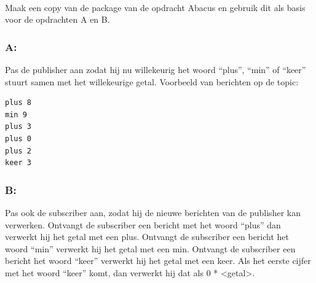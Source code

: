 \begin{exercise}\mbox{}\\
Maak een copy van de package van de opdracht Abacus en gebruik dit als basis voor de opdrachten A en B. 
\subsubsection{A:} 
Pas de publisher aan zodat hij nu willekeurig het woord “plus”, “min” of “keer” stuurt samen met het willekeurige getal. Voorbeeld van berichten op de topic:


\begin{minipage}{0.9\linewidth}
\begin{lstlisting}[style=DOS, firstnumber=0]
plus 8 
min 9 
plus 3 
plus 0 
plus 2 
keer 3
\end{lstlisting}
\end{minipage}

\subsubsection{B:}
Pas ook de subscriber aan, zodat hij de nieuwe berichten van de publisher kan verwerken. Ontvangt de subscriber een bericht met het woord “plus” dan verwerkt hij het getal met een plus. Ontvangt de subscriber een bericht het woord “min” verwerkt hij het getal met een min. Ontvangt de subscriber een bericht het woord “keer” verwerkt hij het getal met een keer. Als het eerste cijfer met het woord “keer” komt, dan verwerkt hij dat als 0 * <getal>.
\end{exercise}

\newpage %

